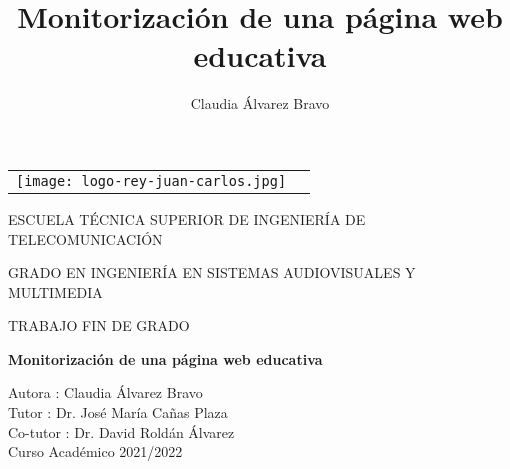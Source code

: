 \documentclass[a4paper, 12pt, oneside]{book}
\title{Monitorización de una página web educativa}
\author{Claudia Álvarez Bravo}
\begin{document}
\begin{titlepage}
\begin{center}
\begin{tabular}[c]{c c}
\texttt{[image: logo-rey-juan-carlos.jpg]} &
\end{tabular}


\vspace{0.5cm}

\Large
ESCUELA TÉCNICA SUPERIOR DE INGENIERÍA DE
TELECOMUNICACIÓN 
\vspace{1cm}

\Large
GRADO EN INGENIERÍA EN SISTEMAS AUDIOVISUALES Y MULTIMEDIA

\vspace{0.8cm}

TRABAJO FIN DE GRADO

\vspace{1.5cm}

\LARGE
\textbf{Monitorización de una página web educativa}
\vspace{1.5cm}

\large
Autora : Claudia Álvarez Bravo \\
Tutor : Dr. José María Cañas Plaza \\
Co-tutor : Dr. David Roldán Álvarez \\

\vspace{1.5cm}
\large
Curso Académico 2021/2022
\end{center}
\end{titlepage}



\normalsize



\tableofcontents
\thispagestyle{empty}

\listoffigures
\thispagestyle{empty}

 \cleardoublepage
\pagestyle{fancy}
\fancyhead[LE,RO]{}
\setlength{\parindent}{6mm}









\printbibliography
\end{document}
